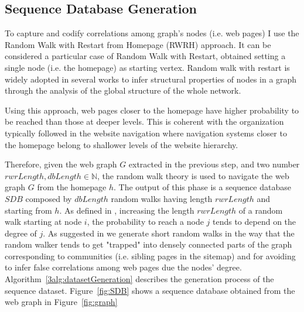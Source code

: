\subsection{Sequence Database Generation}
\label{dbGeneration}

To capture and codify correlations among graph's nodes (i.e. web pages) I use the Random Walk with Restart from Homepage (RWRH) approach. It can be considered a 
particular case of Random Walk with Restart, obtained setting a single node (i.e. the homepage) as starting vertex. Random walk with restart is widely adopted in several works to infer structural properties of nodes in a graph through the analysis of the global structure of the whole network.

Using this approach, web pages closer to the homepage have higher probability to be reached than those at deeper levels. %
This is coherent with the organization typically followed in the website navigation where navigation systems closer to the homepage belong to shallower levels of the website hierarchy.

Therefore, given the web graph $G$ extracted in the previous step, and two number $rwrLength, dbLength \in  \mathbb{N} $, the random walk theory is used to navigate the web graph $G$ from the homepage $h$. 
The output of this phase is a sequence database $SDB$ composed by $dbLength$ random walks having length $rwrLength$ and starting from $h$. As defined in \cite{Pons:2006}, increasing the length $rwrLength$ of a random walk starting at node $i$, the probability to reach a node $j$ tends to depend on the degree of $j$. As suggested in \cite{Pons:2006} we generate short random walks in the way that the random walker tends to get "trapped" into densely connected parts of the graph corresponding to communities (i.e. sibling pages in the sitemap) and for avoiding to infer false correlations among web pages due the nodes' degree.
Algorithm~\ref{3alg:datasetGeneration} describes the generation process of the sequence dataset.
Figure~\ref{fig:SDB} shows a sequence database obtained from the web graph in Figure~\ref{fig:graph}


